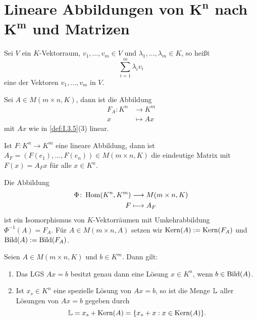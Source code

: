 \section{Lineare Abbildungen von $\mathbf{K^n}$ nach $\mathbf{K^m}$ und Matrizen}

\begin{definition}[Linearkombination]
	\label{def:I.6.1}
	Sei $V$ ein $K$-Vektorraum, $v_1,\dots,v_m \in V$ und $\lambda_1,\dots,\lambda_m \in K$, so heißt
	\[
		\sum_{i=1}^{m} \lambda_i v_i
	\]
	eine  der Vektoren $v_1,\dots,v_m$ in $V$.
\end{definition}

\setcounter{definition}{2}
\begin{lemma}
	\label{lemma:I.6.3}
	Sei $A \in M(m \times n,K)$, dann ist die Abbildung
	\begin{align*}
		F_A \colon K^n &\longrightarrow K^m \\
		x &\longmapsto Ax
	\end{align*}
	mit $Ax$ wie in \autoref{def:I.3.5}(3) linear.
\end{lemma}

\begin{satz}
	\label{satz:I.6.4}
	Ist $F\colon K^n \rightarrow K^m$ eine lineare Abbildung, dann ist $A_F = (F(e_1),\dots,F(e_n)) \in M(m\times n,K)$ die eindeutige Matrix mit $F(x) = A_F x$ für alle $x \in K^n$.
\end{satz}

\setcounter{definition}{5}
\begin{satz}
	\label{satz:I.6.6}
	Die Abbildung
	\begin{align*}
		\Phi \colon \operatorname{Hom}(K^n,K^m) &\longrightarrow M(m \times n,K) \\
		F &\longmapsto A_F
	\end{align*}
	ist ein Isomorphismus von $K$-Vektorräumen mit Umkehrabbildung $\Phi^{-1}(A) = F_A$.
	Für $A \in M(m\times n,A)$ setzen wir $\operatorname{Kern}(A) := \operatorname{Kern}(F_A)$ und $\operatorname{Bild}(A) := \operatorname{Bild}(F_A)$.
\end{satz}

\setcounter{definition}{7}
\begin{satz}
	\label{satz:I.6.8}
	Seien $A \in M(m\times n,K)$ und $b \in K^m$.
	Dann gilt:
	\begin{enumerate}[(1)]
		\item Das LGS $Ax = b$ besitzt genau dann eine Lösung $x \in K^n$, wenn $b \in \operatorname{Bild}(A)$.
		\item Ist $x_s \in K^n$ eine spezielle Lösung von $Ax=b$, so ist die Menge $\mathbb{L}$ aller Lösungen von $Ax=b$ gegeben durch
		\[
			\mathbb{L} = x_s + \operatorname{Kern}(A) = \{x_s + x : x \in \operatorname{Kern}(A)\}.
		\]
	\end{enumerate}
\end{satz}

